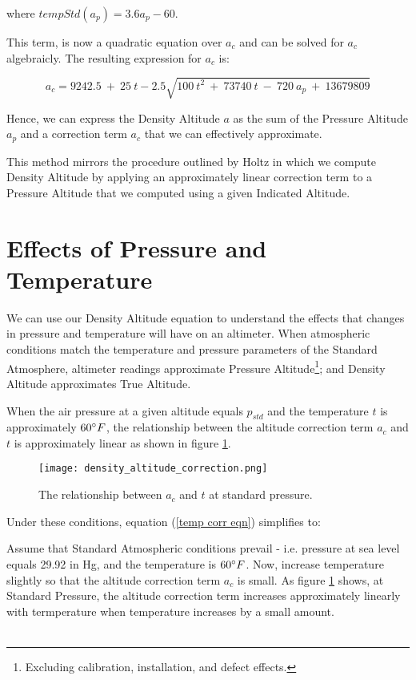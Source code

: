 \documentclass[10pt,a4paper]{article}
\begin{document}
where $tempStd (a_p) = 3.6 a_p - 60$.

This term, is now a quadratic equation over $a_{c}$ and can be solved for $a_{c}$ algebraicly. The resulting expression for $a_c$ is:

\begin{equation}
a_c = 9242.5\ +\ 25\ t - 2.5 \sqrt{100\ t^2\ +\ 73740\ t\ -\ 720\ a_p\ +\ 13679809}                                                                                                                                         
\end{equation}

Hence, we can express the Density Altitude $a$ as the sum of the Pressure Altitude $a_{p}$ and a correction term $a_{c}$ that we can effectively approximate.

This method mirrors the procedure outlined by Holtz in which we compute Density Altitude by applying an approximately linear correction term to a Pressure Altitude that we computed using a given Indicated Altitude.

\section{Effects of Pressure and Temperature}

We can use our Density Altitude equation to understand the effects that changes in pressure and temperature will have on an altimeter. When atmospheric conditions match the temperature and pressure parameters of the Standard Atmosphere, altimeter readings approximate Pressure Altitude\footnote{Excluding calibration, installation, and defect effects.}; and Density Altitude approximates True Altitude.

When the air pressure at a given altitude equals $p_{std}$ and the temperature $t$ is approximately $60\degree F$, the relationship between the altitude correction term $a_c$ and $t$ is approximately linear as shown in figure \ref{plot alt corr temp}.

\begin{figure}[H]
\texttt{[image: density\_altitude\_correction.png]}
\caption{The relationship between $a_c$ and $t$ at standard pressure.}
\label{plot alt corr temp}
\end{figure}

Under these conditions, equation (\ref{temp corr eqn}) simplifies to:



Assume that Standard Atmospheric conditions prevail - i.e. pressure at sea level equals 29.92 in Hg, and the temperature is $60\degree F$. Now, increase temperature slightly so that the altitude correction term $a_c$ is small. As figure \ref{plot alt corr temp} shows, at Standard Pressure, the altitude correction term increases approximately linearly with termperature when temperature increases by a small amount.


\begin{align}
\end{align}
\end{document}
